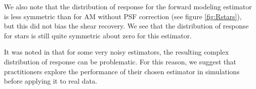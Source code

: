 \documentclass[iop]{emulateapj}
\begin{document}
We also note that the distribution of response for the forward modeling
estimator is less symmetric than for AM without PSF correction (see figure
\ref{fig:Rstars}), but this did not bias the shear recovery.  We see that the
distribution of response for stars is still quite symmetric about zero for this
estimator.

It was noted in \cite{HuffMcal} that for some very noisy estimators, the
resulting complex distribution of response can be problematic.  For this
reason, we suggest that practitioners explore the performance of their chosen
estimator in simulations before applying it to real data.




\end{document}
